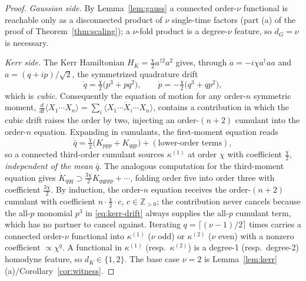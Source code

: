 \documentclass[10pt,a4paper]{amsart}
\begin{document}
\begin{proof}
\emph{Gaussian side.} By Lemma~\ref{lem:gauss} a connected order-$\nu$ functional
is reachable only as a disconnected product of $\nu$ single-time factors
(part (a) of the proof of Theorem~\ref{thm:scaling}); a $\nu$-fold product is a
degree-$\nu$ feature, so $d_G=\nu$ is necessary.

\emph{Kerr side.} The Kerr Hamiltonian $H_K=\tfrac{\chi}{2}a^{\dagger2}a^2$ gives,
through $\dot a=-i\chi a^\dagger a a$ and $a=(q+ip)/\sqrt2$, the symmetrized
quadrature drift
\begin{equation}
\dot q = \tfrac{\chi}{2}\big(p^3+pq^2\big),\qquad
\dot p = -\tfrac{\chi}{2}\big(q^3+qp^2\big),
\label{eq:kerr-drift}
\end{equation}
which is \emph{cubic}. Consequently the equation of motion for any order-$n$
symmetric moment, $\frac{d}{dt}\langle X_1\cdots X_n\rangle
=\sum_i\langle X_1\cdots\dot X_i\cdots X_n\rangle$, contains a contribution in
which the cubic drift raises the order by two, injecting an order-$(n{+}2)$
cumulant into the order-$n$ equation. Expanding in cumulants, the first-moment
equation reads
\[
\dot{\bar q}=\tfrac{\chi}{2}\big(K_{ppp}+K_{qqp}\big)+(\text{lower-order terms}),
\]
so a connected third-order cumulant sources $\kappa^{(1)}$ at order $\chi$ with
coefficient $\tfrac{\chi}{2}$, \emph{independent of the mean} $\bar q$. The
analogous computation for the third-moment equation gives
$\dot K_{qqq}\supset\tfrac{3\chi}{2}K_{qqppp}+\cdots$, folding order five into
order three with coefficient $\tfrac{3\chi}{2}$. By induction, the order-$n$
equation receives the order-$(n{+}2)$ cumulant with coefficient
$n\cdot\tfrac{\chi}{2}\cdot c$, $c\in\mathbb{Z}_{>0}$; the contribution never
cancels because the all-$p$ monomial $p^3$ in \eqref{eq:kerr-drift} always supplies
the all-$p$ cumulant term, which has no partner to cancel against. Iterating
$q=\lceil(\nu-1)/2\rceil$ times carries a connected order-$\nu$ functional into
$\kappa^{(1)}$ ($\nu$ odd) or $\kappa^{(2)}$ ($\nu$ even) with a nonzero
coefficient $\propto\chi^{q}$. A functional in $\kappa^{(1)}$ (resp.\
$\kappa^{(2)}$) is a degree-1 (resp.\ degree-2) homodyne feature, so $d_K\in\{1,2\}$.
The base case $\nu=2$ is Lemma~\ref{lem:kerr}(a)/Corollary~\ref{cor:witness}.
\end{proof}
\end{document}
